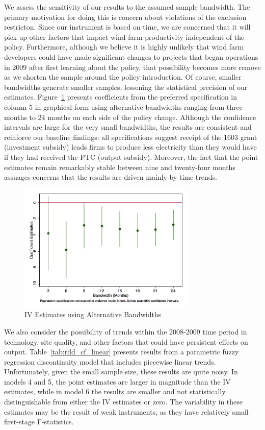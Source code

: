 \documentclass[12pt]{article}
\begin{document}
We assess the sensitivity of our results to the assumed sample bandwidth. The primary motivation for doing this is concern about violations of the exclusion restricton. Since our instrument is based on time, we are concerned that it will pick up other factors that impact wind farm productivity independent of the policy. Furthermore, although we believe it is highly unlikely that wind farm developers could have made significant changes to projects that began operations in 2009 after first learning about the policy, that possibility becomes more remove as we shorten the sample around the policy introduction. Of course, smaller bandwidths generate smaller samples, lessening the statistical precision of our estimates. Figure~\ref{fig:CFbandwidths} presents coefficients from the preferred specification in column 5 in graphical form using alternative bandwidths ranging from three months to 24 months on each side of the policy change. Although the confidence intervals are large for the very small bandwidths, the results are consistent and reinforce our baseline findings: all specifications suggest receipt of the 1603 grant (investment subsidy) leads firms to produce less electricity than they would have if they had received the PTC (output subsidy). Moreover, the fact that the point estimates remain remarkably stable between nine and twenty-four months assuages concerns that the results are driven mainly by time trends.

\begin{figure}[H]
\caption{IV Estimates using Alternative Bandwidths \label{fig:CFbandwidths}}
\centering{}\includegraphics[width=0.75\textwidth]{../output/figures/fuzzyRDD_capfactor_bandwidths_nostateFEs.png}
\end{figure}

We also consider the possibility of trends within the 2008-2009 time period in technology, site quality, and other factors that could have persistent effects on output. Table~\ref{tab:rdd_cf_linear} presents results from a parametric fuzzy regression discontinuity model that includes piecewise linear trends. Unfortunately, given the small sample size, these results are quite noisy. In models 4 and 5, the point estimates are larger in magnitude than the IV estimates, while in model 6 the results are smaller and not statistically distinguishable from either the IV estimates or zero. The variability in these estimates may be the result of weak instruments, as they have relatively small first-stage F-statistics.
\end{document}
